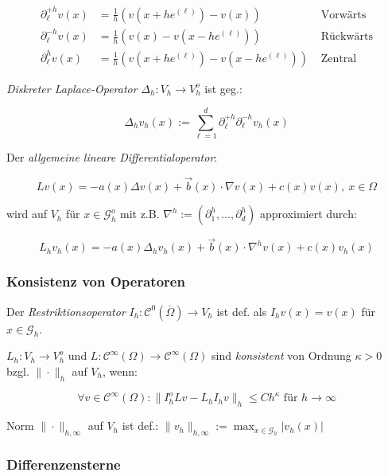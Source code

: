 \vspace*{-4mm}
\begin{align*}
\partial_\ell^{+h} v(x) &= \frac{1}{h} \left( v(x+he^{(\ell)}) - v(x) \right) &\text{ Vorwärts} \\
\partial_\ell^{-h} v(x) &= \frac{1}{h} \left( v(x) - v(x-he^{(\ell)}) \right) &\text{ Rückwärts} \\
\partial_\ell^{h} v(x) &= \frac{1}{h} \left( v(x+he^{(\ell)}) - v(x - he^{(\ell)}) \right) &\text{ Zentral}
\end{align*}

\emph{Diskreter Laplace-Operator} $\Delta_h : V_h \to V_h^o$ ist geg.:

\vspace*{-2mm}
$$\Delta_h v_h(x) := \sum_{\ell = 1}^d \partial_\ell^{+h} \partial_\ell^{-h} v_h(x)$$

Der \emph{allgemeine lineare Differentialoperator}:

\vspace*{-4mm}
$$Lv(x) = -a(x)\Delta v(x) + \vec{b}(x) \cdot \nabla v(x) + c(x)v(x), \ x \in \Omega$$

wird auf $V_h$ für $x \in \mathcal{G}_h^o$ mit z.B. $\nabla^h := \left(\partial_1^h,\dots,\partial_d^h\right)$ approximiert durch:

\vspace*{-4mm}
$$L_h v_h(x) = -a(x)\Delta_h v_h(x) + \vec{b}(x) \cdot \nabla^h v(x) + c(x)v_h(x)$$

\subsubsection*{Konsistenz von Operatoren}

Der \emph{Restriktionsoperator} $I_h : \mathcal{C}^0(\overline\Omega) \to V_h$ ist def. als $I_h v(x) = v(x)$ für $x \in \mathcal{G}_h$. 

\spacing

$L_h : V_h \to V_h^o$ und $L : \mathcal{C}^\infty(\Omega) \to \mathcal{C}^\infty(\Omega)$ sind \emph{konsistent} von Ordnung $\kappa > 0$ bzgl. $\|\cdot\|_h$ auf $V_h$, wenn:

\vspace*{-4mm}
$$\forall v \in \mathcal{C}^\infty(\Omega) : \|I_h^o Lv - L_h I_h v\|_h \leq C h^\kappa \text{ für } h \to \infty$$

Norm $\|\cdot\|_{h,\infty}$ auf $V_h$ ist def.: $\|v_h\|_{h,\infty} := \displaystyle\max_{x \in \mathcal{G}_h} |v_h(x)|$

\subsubsection*{Differenzensterne}


